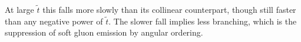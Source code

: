 At large \(\tilde{t}\) this falls more slowly than its collinear counterpart, though
still faster than any negative power of \(\tilde{t}\). The slower fall implies less
branching, which is the suppression of soft gluon emission by angular ordering.


%









